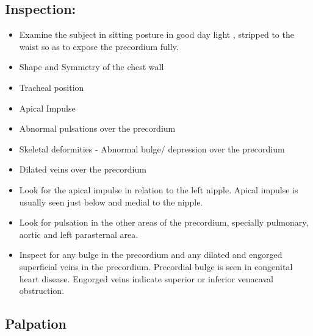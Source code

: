 \documentclass[a4paper,12pt,openany,oneside]{book}
\begin{document}
\subsection*{Inspection:}
\par
\begin{itemize}
\item{Examine the subject in sitting posture in good day light , stripped to the waist so as to expose the precordium fully.}
\item{Shape and Symmetry of the chest wall}
\item{Tracheal position}
\item{Apical Impulse}
\item{Abnormal pulsations over the precordium}
\item{Skeletal deformities - Abnormal bulge/ depression over the precordium}
\item{Dilated veins over the precordium}
\item{	Look for the apical impulse in relation to the left nipple. Apical impulse is usually seen just below and medial to the nipple.}
\item{	Look for pulsation in the other areas of the precordium, specially pulmonary, aortic and left parasternal area.}
\item{	Inspect for any bulge in the precordium and any dilated and engorged superficial veins in the precordium. Precordial bulge is seen in congenital heart disease. Engorged veins indicate superior or inferior venacaval obstruction.}
\end{itemize}

\subsection*{Palpation}
\end{document}
